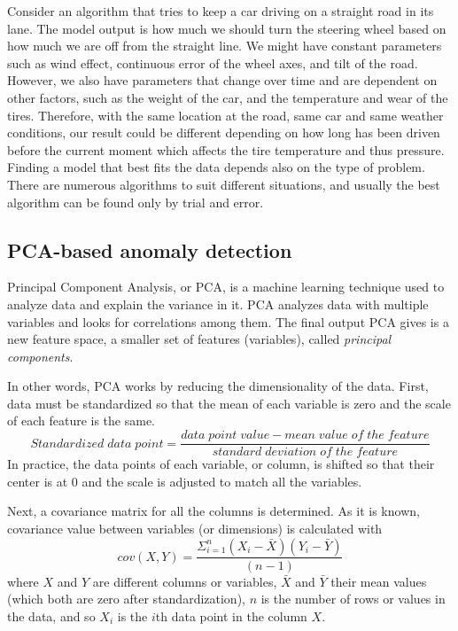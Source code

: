 Consider an algorithm that tries to keep a car
driving on a straight road in its lane.
The model output is how much we should turn the steering wheel
based on how much we are off from the straight line.
We might have constant parameters such as
wind effect, continuous error of the wheel axes, and tilt of the road.
However,
we also have parameters that change over time
and are dependent on other factors,
such as the weight of the car,
and the temperature and wear of the tires.
Therefore, with the same location at the road,
same car and same weather conditions,
our result could be different
depending on how long has been driven before the current moment
which affects the tire temperature and thus pressure.
Finding a model that best fits the data
depends also on the type of problem.
There are numerous algorithms to suit different situations,
and usually the best algorithm can be found
only by trial and error.



\subsection{PCA-based anomaly detection}\label{subsec:bg-pca-ada}

Principal Component Analysis, or PCA,
is a machine learning technique
used to analyze data and explain the variance in it.
PCA analyzes data with multiple variables
and looks for correlations among them.
The final output PCA gives
is a new feature space,
\ie a smaller set of features (variables),
called \textit{principal components}.~\cite{azure2022pca}

In other words,
PCA works by reducing the dimensionality of the data.
First,
data must be standardized
so that the mean of each variable is zero
and the scale of each feature is the same.
\begin{equation}
    Standardized\; data\; point = \frac{data\; point\; value - mean\; value\; of\; the\; feature}{standard\; deviation\; of\; the\; feature}
\end{equation}
In practice,
the data points of each variable, or column,
is shifted so that their center is at 0
and the scale is adjusted to match all the variables.

Next, a covariance matrix for all the columns is determined.
As it is known,
covariance value between variables (or dimensions)
is calculated with
\begin{equation}
    cov(X,Y) = \frac{\Sigma_{i=1}^{n}(X_{i}-\bar{X})(Y_{i}-\bar{Y})}{(n-1)}
\end{equation}
where $X$ and $Y$ are different columns or variables,
$\bar{X}$ and $\bar{Y}$ their mean values (which both are zero after standardization),
$n$ is the number of rows or values in the data,
and so $X_{i}$ is the $i$th data point in the column $X$.~\cite{smith2002tutorial}


